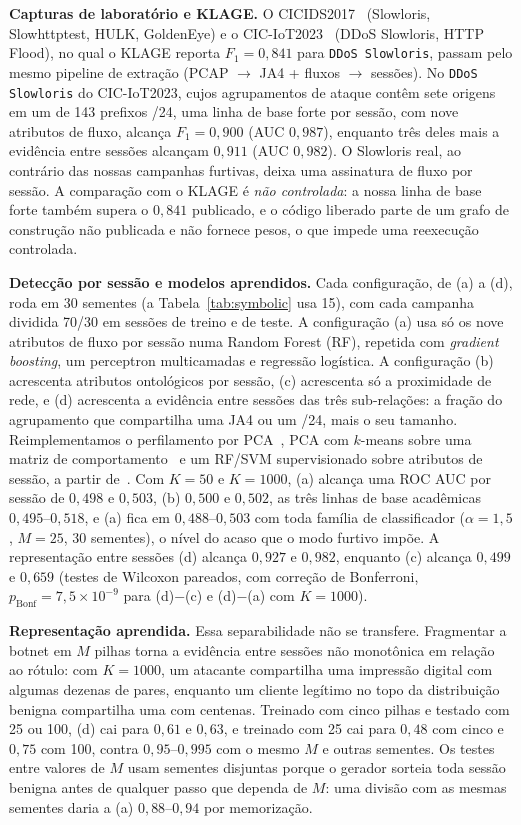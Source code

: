 \documentclass[conference,letterpaper,10pt]{IEEEtran}
\newcommand\1{\textit{(i)}}
\newcommand\2{\textit{(ii)}}
\newcommand\3{\textit{(iii)}}
\begin{document}
\textbf{Capturas de laboratório e KLAGE.} O CICIDS2017~\cite{sharafaldin2018cicids} (Slowloris, Slowhttptest, HULK, GoldenEye) e o CIC-IoT2023~\cite{neto2023ciciot} (DDoS Slowloris, HTTP Flood), no qual o KLAGE reporta $F_1 = 0{,}841$ para \texttt{DDoS Slowloris}, passam pelo mesmo pipeline de extração (PCAP $\rightarrow$ JA4 + fluxos $\rightarrow$ sessões). No \texttt{DDoS Slowloris} do CIC-IoT2023, cujos agrupamentos de ataque contêm sete origens em um de 143 prefixos /24, uma linha de base forte por sessão, com nove atributos de fluxo, alcança $F_1 = 0{,}900$ (AUC $0{,}987$), enquanto três deles mais a evidência entre sessões alcançam $0{,}911$ (AUC $0{,}982$). O Slowloris real, ao contrário das nossas campanhas furtivas, deixa uma assinatura de fluxo por sessão. A comparação com o KLAGE é \textit{não controlada}: a nossa linha de base forte também supera o $0{,}841$ publicado, e o código liberado parte de um grafo de construção não publicada e não fornece pesos, o que impede uma reexecução controlada.

\textbf{Detecção por sessão e modelos aprendidos.} Cada configuração, de (a) a (d), roda em 30 sementes (a Tabela~\ref{tab:symbolic} usa 15), com cada campanha dividida 70/30 em sessões de treino e de teste. A configuração (a) usa só os nove atributos de fluxo por sessão numa Random Forest (RF), repetida com \textit{gradient boosting}, um perceptron multicamadas e regressão logística. A configuração (b) acrescenta atributos ontológicos por sessão, (c) acrescenta só a proximidade de rede, e (d) acrescenta a evidência entre sessões das três sub-relações: a fração do agrupamento que compartilha uma JA4 ou um /24, mais o seu tamanho. Reimplementamos o perfilamento por PCA~\cite{fernandes2015autonomous}, PCA com $k$-means sobre uma matriz de comportamento~\cite{bharathi2012pca} e um RF/SVM supervisionado sobre atributos de sessão, a partir de~\cite{kemp2023approach}. Com $K = 50$ e $K = 1000$, (a) alcança uma ROC AUC por sessão de $0{,}498$ e $0{,}503$, (b) $0{,}500$ e $0{,}502$, as três linhas de base acadêmicas $0{,}495$--$0{,}518$, e (a) fica em $0{,}488$--$0{,}503$ com toda família de classificador ($\alpha = 1{,}5$, $M = 25$, 30 sementes), o nível do acaso que o modo furtivo impõe. A representação entre sessões (d) alcança $0{,}927$ e $0{,}982$, enquanto (c) alcança $0{,}499$ e $0{,}659$ (testes de Wilcoxon pareados, com correção de Bonferroni, $p_{\mathrm{Bonf}} = 7{,}5\times 10^{-9}$ para (d)$-$(c) e (d)$-$(a) com $K = 1000$).

\textbf{Representação aprendida.} Essa separabilidade não se transfere. Fragmentar a botnet em $M$ pilhas torna a evidência entre sessões não monotônica em relação ao rótulo: com $K = 1000$, um atacante compartilha uma impressão digital com algumas dezenas de pares, enquanto um cliente legítimo no topo da distribuição benigna compartilha uma com centenas. Treinado com cinco pilhas e testado com 25 ou 100, (d) cai para $0{,}61$ e $0{,}63$, e treinado com 25 cai para $0{,}48$ com cinco e $0{,}75$ com 100, contra $0{,}95$--$0{,}995$ com o mesmo $M$ e outras sementes. Os testes entre valores de $M$ usam sementes disjuntas porque o gerador sorteia toda sessão benigna antes de qualquer passo que dependa de $M$: uma divisão com as mesmas sementes daria a (a) $0{,}88$--$0{,}94$ por memorização.
\end{document}
